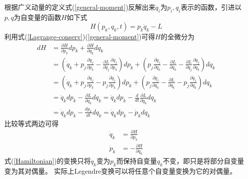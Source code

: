\documentclass[12pt]{article}
\numberwithin{equation}{section}
\begin{document}
        根据广义动量的定义式(\ref{general-moment})反解出来$\dot{q}_i$为$p_i,q_i$表示的函数，引进以$p,q$为自变量的函数$H$如下式
        \begin{equation}\label{Hamiltonian}
            H(p_k,q_k,t)=p_k\dot{q}_k-L
        \end{equation}
        利用式(\ref{Lagrange-conserv})(\ref{general-moment})可得$H$的全微分为
        \begin{equation*}
           \begin{aligned}
               dH&=\frac{\partial H}{\partial p_k}dp_k+\frac{\partial H}{\partial q_k}dq_k\\
               &=\left( \dot{q}_k+p_j\frac{\partial \dot{q}_j}{\partial p_k}-\frac{\partial L}{\partial \dot{q}_j}\frac{\partial \dot{q}_j}{\partial p_k} \right)dp_k
               +\left( p_j\frac{\partial \dot{q}_j}{\partial q_k}-\frac{\partial L}{\partial q_k}-\frac{\partial L}{\partial \dot{q}_j}\frac{\partial \dot{q}_j}{\partial q_k}\right)dq_k\\
               &=\left( \dot{q}_k+p_j\frac{\partial \dot{q}_j}{\partial p_k}-p_j\frac{\partial \dot{q}_j}{\partial p_k} \right)dp_k
               +\left( p_j\frac{\partial \dot{q}_j}{\partial q_k}-\frac{\partial L}{\partial q_k}-p_j\frac{\partial \dot{q}_j}{\partial q_k}\right)dq_k\\
               &=\dot{q}_kdp_k-\frac{\partial L}{\partial q_k}dq_k=\dot{q}_kdp_k-\frac{d}{dt}\frac{\partial L}{\partial \dot{q}_k}dq_k\\
               &=\dot{q}_kdp_k-\frac{dp_k}{dt}dq_k=\dot{q}_kdp_k-\dot{p}_kdq_k
           \end{aligned}
        \end{equation*}
        比较等式两边可得
        \begin{equation}\label{Hamilton-canonical}
            \begin{aligned}
                \dot{q}_k&=\frac{\partial H}{\partial p_k}\\
                \dot{p}_k&=-\frac{\partial H}{\partial q_k}
            \end{aligned}
        \end{equation}
        式(\ref{Hamiltonian})的变换只将$\dot{q}_k$变为$p_k$而保持自变量$q_k$不变，即只是将部分自变量变为其对偶量。
        实际上Legendre变换可以将任意个自变量变换为它的对偶量。

        
    
\end{document}
